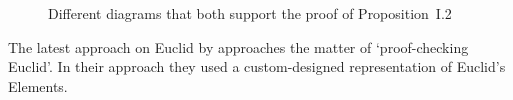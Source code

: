 \documentclass[]{interact}
\theoremstyle{plain}
\theoremstyle{definition}
\theoremstyle{remark}
\newcommand{\quotes}[1]{`#1'}
\begin{document}
\begin{figure}
  \centering

  \break
  \hspace{3pt}
  \caption{Different diagrams that both support the proof of Proposition~I.2}
  \label{fig:prop-i2}
\end{figure}


The latest approach on Euclid
by \citet{beeson-etal:2019} approaches the matter of
\quotes{proof-checking Euclid}.
In their approach they used a custom-designed representation of
Euclid's Elements.
\end{document}
